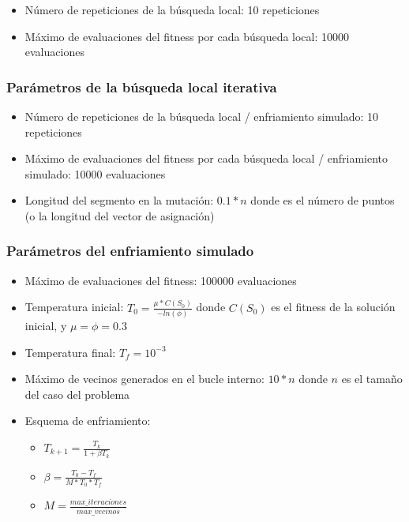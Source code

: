 \documentclass[11pt]{article}
\begin{document}
\begin{itemize}
    \item Número de repeticiones de la búsqueda local: 10 repeticiones
    \item Máximo de evaluaciones del fitness por cada búsqueda local: 10000 evaluaciones
\end{itemize}

\subsubsection{Parámetros de la búsqueda local iterativa} \label{parametros_ils}

\begin{itemize}
    \item Número de repeticiones de la búsqueda local / enfriamiento simulado: 10 repeticiones
    \item Máximo de evaluaciones del fitness por cada búsqueda local / enfriamiento simulado: 10000 evaluaciones
    \item Longitud del segmento en la mutación: $0.1 * n$ donde es el número de puntos (o la longitud del vector de asignación)
\end{itemize}

\subsubsection{Parámetros del enfriamiento simulado} \label{parametros_enfriamiento}

\begin{itemize}
    \item Máximo de evaluaciones del fitness: 100000 evaluaciones
    \item Temperatura inicial: $T_0 = \frac{\mu * C(S_0)}{-ln(\phi)}$ donde $C(S_0)$ es el fitness de la solución inicial, y $\mu = \phi = 0.3$
    \item Temperatura final: $T_f = 10^{-3}$
    \item Máximo de vecinos generados en el bucle interno: $10 * n$ donde $n$ es el tamaño del caso del problema
    \item Esquema de enfriamiento:
        \begin{itemize}
            \item $T_{k+1} = \frac{T_k}{1 + \beta T_k}$
            \item $\beta = \frac{T_0 - T_f}{M * T_0 * T_f}$
            \item $M = \frac{max\_iteraciones}{max\_vecinos}$
        \end{itemize}
\end{itemize}
\end{document}
